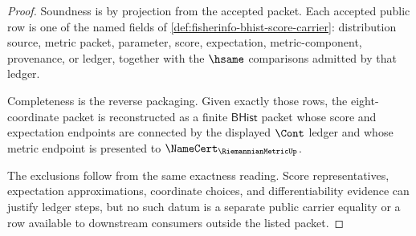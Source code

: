 \begin{proof}
Soundness is by projection from the accepted packet. Each accepted public row
is one of the named fields of \autoref{def:fisherinfo-bhist-score-carrier}:
distribution source, metric packet, parameter, score, expectation,
metric-component, provenance, or ledger, together with the $\hsame$
comparisons admitted by that ledger.

Completeness is the reverse packaging. Given exactly those rows, the
eight-coordinate packet is reconstructed as a finite $\mathsf{BHist}$ packet
whose score and expectation endpoints are connected by the displayed $\Cont$
ledger and whose metric endpoint is presented to
$\NameCert_{\RiemannianMetricUp}$.

The exclusions follow from the same exactness reading. Score representatives,
expectation approximations, coordinate choices, and differentiability evidence
can justify ledger steps, but no such datum is a separate public carrier
equality or a row available to downstream consumers outside the listed packet.
\end{proof}

